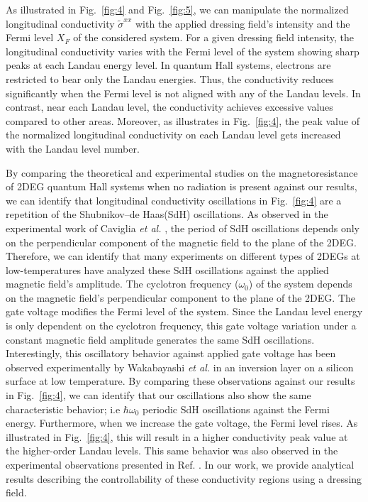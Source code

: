 \documentclass[
 reprint,
 amsmath,amssymb,
 aps,
 prb,
]{revtex4-2}
\begin{document}
As illustrated in Fig.~\ref{fig:4} and Fig.~\ref{fig:5}, we can manipulate the normalized longitudinal conductivity $\widetilde{\sigma}^{xx}$ with the applied dressing field's intensity and the Fermi level $X_F$ of the considered system.
For a given dressing field intensity, the longitudinal conductivity varies with  the Fermi level of the system showing sharp peaks at each Landau energy level.
In quantum Hall systems, electrons are restricted to bear only the Landau energies. Thus, the conductivity reduces significantly when the Fermi level is not aligned with any of the Landau levels. In contrast, near each Landau level, the conductivity achieves excessive values compared to other areas. Moreover, as illustrates in Fig.~\ref{fig:4}, the peak value of the normalized longitudinal conductivity on each Landau level gets increased with the Landau level number.

{\color{Red}
By comparing the theoretical \cite{ando72,ando74_1,ando74_2,ando74_3,ando74_4,ando82,endo09} and experimental \cite{endo09,wakabayashi78,ochiai190,mancoff96,arapov02,grbic04,caviglia10} studies on the magnetoresistance of 2DEG quantum Hall systems when no radiation is present against our results, we can identify that longitudinal conductivity oscillations in Fig.~\ref{fig:4} are a repetition of the Shubnikov–de Haas(SdH) oscillations.
As observed in the experimental work of Caviglia \textit{et al.} \cite{caviglia10}, the period of SdH oscillations depends only on the perpendicular component of the magnetic field to the plane of the 2DEG.
Therefore, we can identify that many experiments on different types of 2DEGs at low-temperatures \cite{endo09,ochiai190,mancoff96,arapov02,grbic04,caviglia10} have analyzed these SdH oscillations against the applied magnetic field's amplitude.
The cyclotron frequency ($\omega_0$) of the system depends on the magnetic field's perpendicular component to the plane of the 2DEG.
The gate voltage modifies the Fermi level of the system.
Since the Landau level energy is only dependent on the cyclotron frequency, this gate voltage variation under a constant magnetic field amplitude generates the same SdH oscillations.
Interestingly, this oscillatory behavior against applied gate voltage has been observed experimentally by Wakabayashi \textit{et al.} \cite{wakabayashi78} in an inversion layer on a silicon surface at low temperature.
By comparing these observations against our results in Fig.~\ref{fig:4}, we can identify that our oscillations also show the same characteristic behavior; i.e  $\hbar\omega_0$ periodic SdH oscillations against the Fermi energy.
Furthermore, when we increase the gate voltage, the Fermi level rises. As illustrated in Fig.~\ref{fig:4}, this will result in a higher conductivity peak value at the higher-order Landau levels. This same behavior was also observed in the experimental observations presented in Ref. \cite{wakabayashi78}.
In our work, we provide analytical results describing the controllability of these conductivity regions using a dressing field.}
\end{document}
